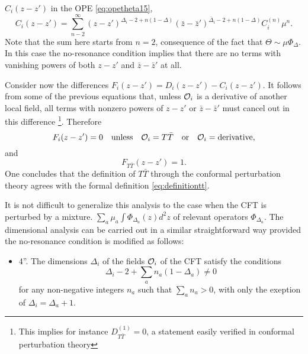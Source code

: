 $C_i(z-z')$ in the OPE \eqref{eq:opetheta15},
\begin{equation}
  C_i(z-z') = \sum_{n-2}^{\infty}(z-z')^{\Delta_i
    - 2 +n(1-\Delta)}(\bar{z}-\bar{z}')^{\bar{\Delta}_i -2
  +n(1-\Delta)}C_i^{(n)}\mu^n.
\end{equation}
Note that the sum here starts from $n=2$, consequence of the fact that
$\Theta\sim\mu\Phi_\Delta$. In this case the no-resonance condition implies
that there are no terms with vanishing powers of both $z-z'$ and
$\bar{z}-\bar{z}'$ at all.
\par Consider now the differences $F_i(z-z') = D_i(z-z') - C_i(z-z')$. It
follows from some of the previous equations that, unless $\mathcal{O}_i$ is
a derivative of another local field, all terms with nonzero powers of $z-z'$ or
$\bar{z}-\bar{z}'$ must cancel out in this difference \footnote{This implies
  for  instance $D_{T\bar{T}}^{(1)} = 0$, a statement easily verified in
conformal perturbation theory}. Therefore
\begin{equation}
  F_i(z-z') = 0\quad \mathrm{unless}\quad \mathcal{O}_i
  = T\bar{T}\quad\mathrm{or}\quad\mathcal{O}_i=\mathrm{derivative},
\end{equation}
and
\begin{equation}
  F_{T\bar{T}}(z-z') = 1.
\end{equation}
One concludes that the definition of $T\bar{T}$ through the conformal
perturbation theory agrees with the formal definition \eqref{eq:definitiontt}.
\par It is not difficult to generalize this analysis to the case when the CFT
is perturbed by a mixture. $\sum_a \mu_a \int \Phi_{\Delta_a}(z)d^2z$ of
relevant operators $\Phi_{\Delta_a}$. The dimensional analysis can be carried
out in a similar straightforward way provided the no-resonance condition is 
modified as follows:
\begin{itemize}
 \item 4''. The dimensions $\Delta_i$ of the fields $\mathcal{O}_i$ of the CFT
   satisfy the conditions
   \begin{equation}
     \Delta_i - 2 + \sum_a n_a(1-\Delta_a)\neq 0
   \end{equation}
   for any non-negative integers $n_a$ such that $\sum_a n_a > 0$, with only
   the exeption of $\Delta_i = \Delta_a + 1.$
\end{itemize}
